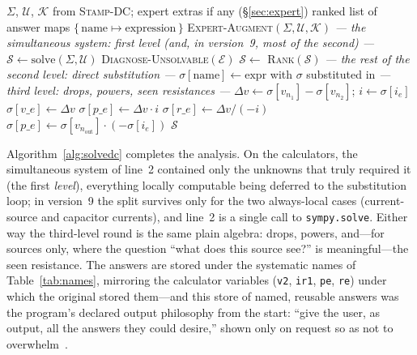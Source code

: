 \documentclass[11pt,oneside]{report}
\newcommand{\kw}[1]{\textsc{#1}}
\newcommand{\code}[1]{\texttt{#1}}
\begin{document}
\begin{algorithm}[htbp]
\caption{\kw{Solve-DC}: the staged solution}
\label{alg:solvedc}
\begin{algorithmic}[1]
\Require $\Sigma$, $\mathcal{U}$, $\mathcal{K}$ from
  \kw{Stamp-DC}; expert extras if any (\S\ref{sec:expert})
\Ensure ranked list of answer maps
  $\{\,\mathrm{name} \mapsto \mathrm{expression}\,\}$
\State \kw{Expert-Augment}$(\Sigma, \mathcal{U}, \mathcal{K})$
\Statex \emph{--- the simultaneous system: first level (and, in
  version~9, most of the second) ---}
\State $\mathcal{S} \gets \mathrm{solve}(\Sigma, \mathcal{U})$
  \State \kw{Diagnose-Unsolvable}$(\mathcal{E})$
\EndIf
\State $\mathcal{S} \gets$ \kw{Rank}$(\mathcal{S})$
  \Statex \quad\emph{--- the rest of the second level: direct
    substitution ---}
    \State $\sigma[\mathrm{name}] \gets \mathrm{expr}$ with $\sigma$
      substituted in
  \EndFor
  \Statex \quad\emph{--- third level: drops, powers, seen
    resistances ---}
  \ForAll{$e \in \mathcal{E}$ of kind \code{e j r c l}}
    \State $\Delta v \gets \sigma[v_{n_1}] - \sigma[v_{n_2}]$;\quad
      $i \gets \sigma[i_e]$
    \State $\sigma[v\_e] \gets \Delta v$
    \State $\sigma[p\_e] \gets \Delta v \cdot i$
    \If{$e$ is a source (\code{e} or \code{j})}
      \State $\sigma[r\_e] \gets \Delta v / (-i)$
    \EndIf
  \EndFor
    \State $\sigma[p\_e] \gets \sigma[v_{n_\mathrm{out}}]
      \cdot (-\sigma[i_e])$
  \EndFor
\EndFor
\State \Return $\mathcal{S}$
\end{algorithmic}
\end{algorithm}

Algorithm~\ref{alg:solvedc} completes the analysis. On the
calculators, the simultaneous system of line~2 contained only the
unknowns that truly required it (the first \emph{level}), everything
locally computable being deferred to the substitution loop; in
version~9 the split survives only for the two always-local cases
(current-source and capacitor currents), and line~2 is a single call
to \code{sympy.solve}. Either way the third-level round is the same
plain algebra: drops, powers, and---for sources only, where the
question ``what does this source see?'' is meaningful---the seen
resistance. The answers are stored under the systematic names of
Table~\ref{tab:names}, mirroring the calculator variables
(\code{v2}, \code{ir1}, \code{pe}, \code{re}) under which the
original stored them---and this store of named, reusable answers was
the program's declared output philosophy from the start: ``give the
user, as output, all the answers they could desire,'' shown only on
request so as not to overwhelm~\cite[\S2.5.1]{thesis2000}.
\end{document}
